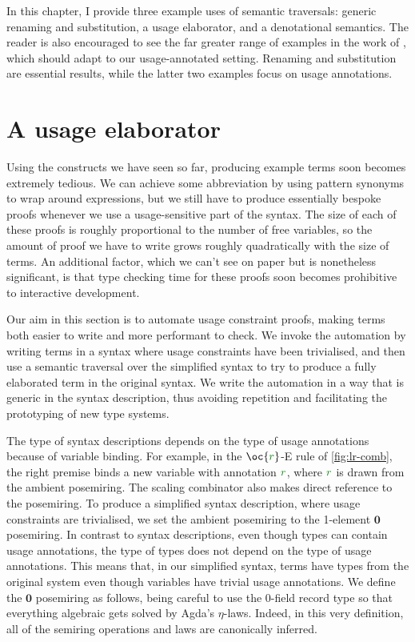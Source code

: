 In this chapter, I provide three example uses of semantic traversals: generic
renaming and substitution, a usage elaborator, and a denotational semantics.
The reader is also encouraged to see the far greater range of examples in the
work of \citet{AACMM21}, which should adapt to our usage-annotated setting.
Renaming and substitution are essential results, while the latter two examples
focus on usage annotations.


\section{A usage elaborator}\label{sec:usage-elaborator}

Using the constructs we have seen so far, producing example terms soon becomes
extremely tedious.
We can achieve some abbreviation by using pattern synonyms to wrap around
 expressions, but we still have to
produce essentially bespoke proofs whenever we use a usage-sensitive part of the
syntax.
The size of each of these proofs is roughly proportional to the number of free
variables, so the amount of proof we have to write grows roughly quadratically
with the size of terms.
An additional factor, which we can't see on paper but is nonetheless
significant, is that type checking time
for these proofs soon becomes prohibitive to interactive development.

Our aim in this section is to automate usage constraint proofs, making terms
both easier to write and more performant to check.
We invoke the automation by writing terms in a syntax where usage constraints
have been trivialised, and then use a semantic traversal over the simplified
syntax to try to produce a fully elaborated term in the original syntax.
We write the automation in a way that is generic in the syntax description, thus
avoiding repetition and facilitating the prototyping of new type systems.

The type of syntax descriptions depends on the type of usage annotations because
of variable binding.
For example, in the $\oc{\gr r}$-E rule of \cref{fig:lr-comb}, the right
premise binds a new variable with annotation $\gr r$, where $\gr r$ is drawn
from the ambient posemiring.
The scaling combinator also makes direct reference to the posemiring.
To produce a simplified syntax description, where usage constraints are
trivialised, we set the ambient posemiring to the 1-element $\mathbf0$
posemiring.
In contrast to syntax descriptions, even though types can contain usage
annotations, the type of types does not depend on the type of usage annotations.
This means that, in our simplified syntax, terms have types from the original
system even though variables have trivial usage annotations.
We define the $\mathbf0$ posemiring as follows, being careful to use the
0-field record type \AgdaRecord{$\top$} so that everything algebraic gets
solved by Agda's $\eta$-laws.
Indeed, in this very definition, all of the semiring operations and laws are
canonically inferred.

